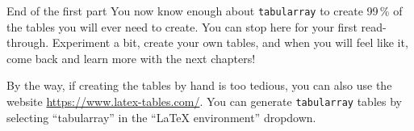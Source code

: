 \vspace*{\fill} %

\begin{infobox}{End of the first part}
	You now know enough about \texttt{tabularray} to create 99\,\% of the tables you will ever need to create. You can stop here for your first read-through. Experiment a bit, create your own tables, and when you will feel like it, come back and learn more with the next chapters!
	\vspace{1em}
	
	By the way, if creating the tables by hand is too tedious, you can also use the website \url{https://www.latex-tables.com/}. You can generate \texttt{tabularray} tables by selecting ``tabularray'' in the ``LaTeX environment'' dropdown.
\end{infobox}

\vfill
